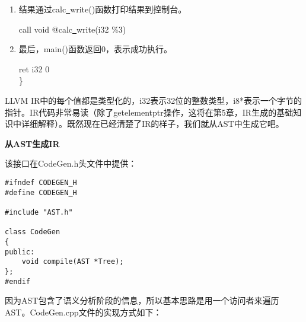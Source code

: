 \begin{enumerate}
\item 结果通过calc\underline{~}write()函数打印结果到控制台。
\begin{tcolorbox}[colback=white,colframe=black]
	\hspace*{1cm}call void @calc\underline{~}write(i32 \%3)
\end{tcolorbox}

\item 最后，main()函数返回0，表示成功执行。
\begin{tcolorbox}[colback=white,colframe=black]
	\hspace*{1cm}ret i32 0 \\
\}
\end{tcolorbox}

\end{enumerate}

LLVM IR中的每个值都是类型化的，i32表示32位的整数类型，i8*表示一个字节的指针。IR代码非常易读（除了getelementptr操作，这将在第5章，IR生成的基础知识中详细解释）。既然现在已经清楚了IR的样子，我们就从AST中生成它吧。\par

\hspace*{\fill} \par %
\textbf{从AST生成IR}

该接口在CodeGen.h头文件中提供：

\begin{lstlisting}[caption={}]
#ifndef CODEGEN_H
#define CODEGEN_H

#include "AST.h"

class CodeGen
{
public:
	void compile(AST *Tree);
};
#endif
\end{lstlisting}

因为AST包含了语义分析阶段的信息，所以基本思路是用一个访问者来遍历AST。CodeGen.cpp文件的实现方式如下：

